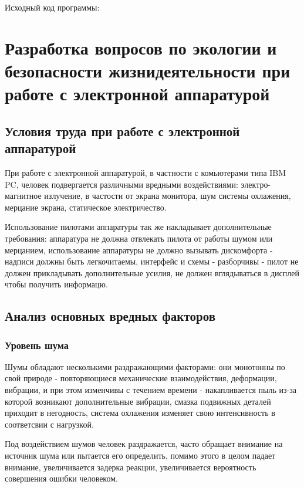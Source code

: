\documentclass[a4paper,12pt]{report} %
\begin{document}
Исходный код программы:





\newpage
\chapter{Разработка вопросов по экологии и безопасности жизнидеятельности при
  работе с электронной \newline аппаратурой} %
\section{Условия труда при работе с электронной аппаратурой}
При работе с электронной аппаратурой, в частности с комьютерами типа IBM PC,
человек подвергается различными вредными воздействиями: электро-магнитное
излучение, в частости от экрана монитора, шум системы охлажения, мерцание
экрана, статическое электричество.

Использование пилотами аппаратуры так же накладывает дополнительные требования:
аппаратура не должна отвлекать пилота от работы шумом или мерцанием,
использование аппаратуры не должно вызывать дискомфорта - надписи должны быть
легкочитаемы, интерфейс и схемы - разборчивы - пилот не должен прикладывать
дополнительные усилия, не должен вглядываться в дисплей чтобы получить
информацю.
\section{Анализ основных вредных факторов}
\subsection{Уровень шума}
Шумы обладают несколькими раздражающими факторами: они монотонны по свой природе
- повторяющиеся механические взаимодействия, деформации, вибрации, и при этом
изменчивы с течением времени - накапливается пыль из-за которой возникают
дополнительные вибрации, смазка подвижных деталей приходит в негодность, система
охлажения изменяет свою интенсивность в соответсвии с нагрузкой.

Под воздействием шумов человек раздражается, часто обращает внимание на источник
шума или пытается его определить, помимо этого в целом падает внимание,
увеличивается задерка реакции, увеличивается вероятность совершения ошибки
человеком.
\end{document}

